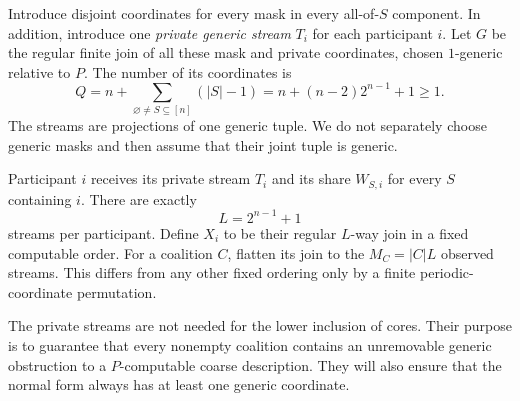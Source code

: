 \documentclass[11pt,letterpaper]{article}
\theoremstyle{plain}
\theoremstyle{definition}
\theoremstyle{remark}
\numberwithin{equation}{section}
\begin{document}
Introduce disjoint coordinates for every mask in every all-of-$S$
component. In addition, introduce one \emph{private generic stream} $T_i$
for each participant $i$. Let $G$ be the regular finite join of all these
mask and private coordinates, chosen $1$-generic relative to $P$.
The number of its coordinates is
\begin{equation}\label{cr11:eq:mastercount}
 Q=n+\sum_{\varnothing\ne S\subseteq[n]}(|S|-1)
                 =n+(n-2)2^{n-1}+1\geq1.
\end{equation}
The streams are projections of one generic tuple. We do not separately
choose generic masks and then assume that their joint tuple is generic.

Participant $i$ receives its private stream $T_i$ and its share $W_{S,i}$
for every $S$ containing $i$. There are exactly
\begin{equation}\label{cr11:eq:width}
                               L=2^{n-1}+1
\end{equation}
streams per participant. Define $X_i$ to be their regular $L$-way join in
a fixed computable order. For a coalition $C$, flatten its join to the
$M_C=|C|L$ observed streams. This differs from any other fixed ordering only
by a finite periodic-coordinate permutation.

The private streams are not needed for the lower inclusion of cores.
Their purpose is to guarantee that every nonempty coalition contains an
unremovable generic obstruction to a $P$-computable coarse description.
They will also ensure that the normal form always has at least one generic
coordinate.
\end{document}
